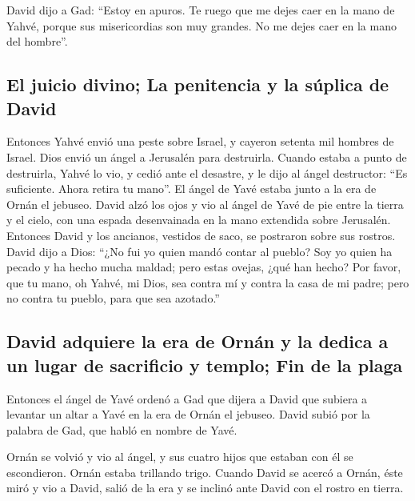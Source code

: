 \begin{paracol}{2}
 David dijo a Gad: ``Estoy en apuros. Te ruego que me
dejes caer en la mano de Yahvé, porque sus misericordias son muy
grandes. No me dejes caer en la mano del hombre''.

\hypertarget{el-juicio-divino-la-penitencia-y-la-suxfaplica-de-david}{%
\subsection{El juicio divino; La penitencia y la súplica de
David}\label{el-juicio-divino-la-penitencia-y-la-suxfaplica-de-david}}

 Entonces Yahvé envió una peste sobre Israel, y cayeron
setenta mil hombres de Israel.  Dios envió un ángel a
Jerusalén para destruirla. Cuando estaba a punto de destruirla, Yahvé lo
vio, y cedió ante el desastre, y le dijo al ángel destructor: ``Es
suficiente. Ahora retira tu mano''. El ángel de Yavé estaba junto a la
era de Ornán el jebuseo.  David alzó los ojos y vio al
ángel de Yavé de pie entre la tierra y el cielo, con una espada
desenvainada en la mano extendida sobre Jerusalén. Entonces David y los
ancianos, vestidos de saco, se postraron sobre sus rostros.
 David dijo a Dios: ``¿No fui yo quien mandó contar al
pueblo? Soy yo quien ha pecado y ha hecho mucha maldad; pero estas
ovejas, ¿qué han hecho? Por favor, que tu mano, oh Yahvé, mi Dios, sea
contra mí y contra la casa de mi padre; pero no contra tu pueblo, para
que sea azotado.''

\hypertarget{david-adquiere-la-era-de-ornuxe1n-y-la-dedica-a-un-lugar-de-sacrificio-y-templo-fin-de-la-plaga}{%
\subsection{David adquiere la era de Ornán y la dedica a un lugar de
sacrificio y templo; Fin de la
plaga}\label{david-adquiere-la-era-de-ornuxe1n-y-la-dedica-a-un-lugar-de-sacrificio-y-templo-fin-de-la-plaga}}

 Entonces el ángel de Yavé ordenó a Gad que dijera a
David que subiera a levantar un altar a Yavé en la era de Ornán el
jebuseo.  David subió por la palabra de Gad, que habló en
nombre de Yavé.

 Ornán se volvió y vio al ángel, y sus cuatro hijos que
estaban con él se escondieron. Ornán estaba trillando trigo.
 Cuando David se acercó a Ornán, éste miró y vio a David,
salió de la era y se inclinó ante David con el rostro en tierra.


\end{paracol}
